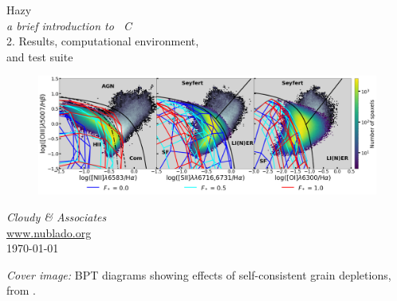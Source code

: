 \documentclass[12pt]{book}
\begin{document}
\frontmatter

\begin{titlepage}
\begin{center}

\Huge
Hazy\\
\Large
\emph{a brief introduction to \Cloudy\ C\VERSION}\\
\LARGE
2. Results, computational environment,\\
and test suite

\begin{figure}
\begin{center}
\includegraphics[clip=on,width=\columnwidth,keepaspectratio]{3bpt_fstarr}
\end{center}
\end{figure}

\vspace{15 mm }
\LARGE
\emph{Cloudy \& Associates} \\
\Large
\href{http://www.nublado.org}{www.nublado.org} \\
\normalsize
\today
\end{center}
\end{titlepage}

\clearpage

\vspace{5mm}
\noindent
{\small
{\em Cover image:}
BPT diagrams showing effects of self-consistent grain depletions,  from
\citet{2023MNRAS.520.4345G}.
}
\clearpage

\setcounter{tocdepth}{2}
\tableofcontents
\listoffigures
\listoftables

\clearpage
\mainmatter
\appendix

\backmatter


\end{document}
